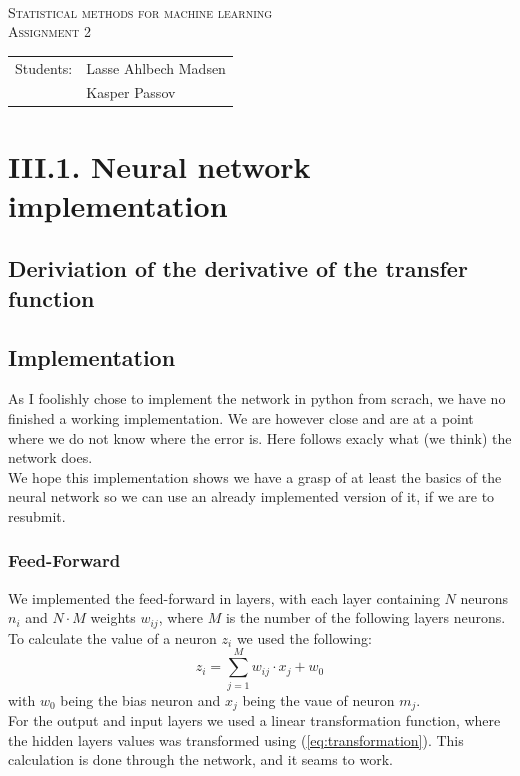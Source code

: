 \documentclass{article}
\begin{document}
\begin{titlepage}
\begin{center}
    \hline \\[0.2cm]
\textsc{\Large Statistical methods for machine learning}\\[0.5cm]
\textsc{\large Assignment 2}\\[0.5cm]
    \hline
    \hline
\vspace{2 cm}
\begin{tabular}{ll}
Students: & Lasse Ahlbech Madsen \\
          & Kasper Passov\\
\end{tabular}
\end{center}
\vspace{5 cm}
\newpage
\end{titlepage}

\section{III.1. Neural network implementation}

\subsection{Deriviation of the derivative of the transfer function}

\newpage

\subsection{Implementation}
As I foolishly chose to implement the network in python from scrach, we have no finished a working implementation. We are however close and are at a point where we do not know where the error is. Here follows exacly what (we think) the network does.\\
We hope this implementation shows we have a grasp of at least the basics of the neural network so we can use an already implemented version of it, if we are to resubmit.

\subsubsection{Feed-Forward}
We implemented the feed-forward in layers, with each layer containing $N$ neurons $n_i$ and $N \cdot M$ weights $w_{ij}$, where $M$ is the number of the following layers neurons.\\
To calculate the value of a neuron $z_i$ we used the following:
\begin{equation}
    z_i = \sum_{j=1}^{M} w_{ij} \cdot x_{j} + w_0
\end{equation}
with $w_0$ being the bias neuron and $x_j$ being the vaue of neuron $m_j$.\\
For the output and input layers we used a linear transformation function, where the hidden layers values was transformed using (\ref{eq:transformation}).
This calculation is done through the network, and it seams to work.
\end{document}
